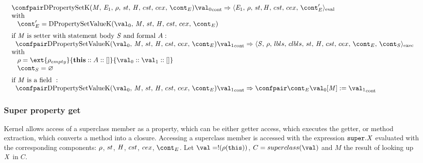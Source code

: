 \documentclass{article}
\renewcommand{\emptyset}{\varnothing}
\newcommand{\cesktrans}[2]{\ensuremath{{#1} \Rightarrow {#2}}}
\begin{document}
\[
  \begin{array}{lcl@{\hspace{30mm}}}
	\cesktrans{
		\contconf{\DirectPropertySetK}{\val_0}}{
		\evalconf{\expressionmeta_1}{\env}{\strace}{\cstrace}{\cex}{\econt'}}\\
	\textrm{with}\\
	\hspace{3mm}
	\econt' = \DPropertySetVK\\[2mm]

	\textrm{if }\membermeta \textrm{ is setter with statement body }\stmt \textrm{ and formal }\formal :\\
	\hspace{2mm}
	\cesktrans{
		\contconf{\DPropertySetVK}{\val_1}}{
		\execconf{\stmt}{\env}{\lbls}{\clbls}{\handler}{\cstrace}{\cex}{\econt}{\scont}}\\
	\textrm{with}\\
	\hspace{3mm}
	\env = \ext{\env_{empty}}{\mathbf{this} :: \formal :: []}{\val_0 :: \val_1 :: []}\\
	\hspace{3mm}
	\scont = \emptyset\\[2mm]

	\textrm{if }\membermeta \textrm{ is a field } :\\
	\hspace{2mm}
	\cesktrans{
		\contconf{\DPropertySetVK}{\val_1}}{
		\contconf{\econt}{\update{\val_0[\membermeta]}{\val_1}}}
  \end{array}
\]

\subsubsection{Super property get}
\label{subsubsec:super-property-get}
Kernel allows access of a superclass member as a property, which can be either getter access, which executes the getter, or method extraction, which converts a method into a closure.
\noindent
Accessing a superclass member is accessed with the expression $\tt{super}.\mathit{X}$ evaluated with the corresponding components: $\rho$, $st$, $\mathit{H}$, $cst$, $cex$, $\econt$.
Let $\val = \deref{(\env(\this))}$, $C = \superclass{\val}$ and $M$ the result of looking up $\mathit{X}$ in $C$.\\
\end{document}
